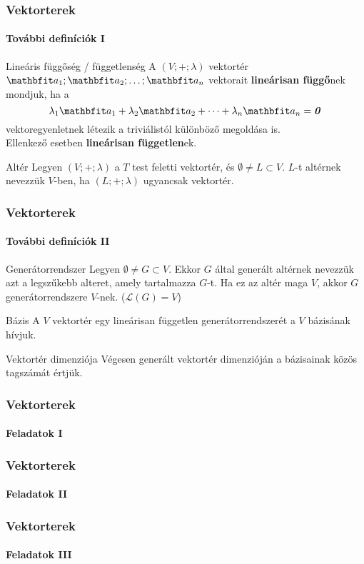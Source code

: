 \begin{frame}
  \frametitle{Vektorterek}
  \framesubtitle{További definíciók I}

  \begin{block}{Lineáris függőség / függetlenség}
    A $(V; +; \lambda)$ vektortér $\rvec a_1; \rvec a_2; \dots; \rvec a_n$
    vektorait \textbf{lineárisan függő}nek mondjuk, ha a
    \[
      \lambda_1 \rvec a_1 +
      \lambda_2 \rvec a_2 +
      \dots +
      \lambda_n \rvec a_n =
      \nvec
    \]
    vektoregyenletnek létezik a triviálistól különböző megoldása is.
    \\[2mm]
    Ellenkező esetben \textbf{lineárisan független}ek.
  \end{block}

  \begin{block}{Altér}
    Legyen $(V; +; \lambda)$ a $T$ test feletti vektortér, és
    $\emptyset \neq L \subset V$. $L$-t altérnek nevezzük $V$-ben, ha
    $(L; +; \lambda)$ ugyancsak vektortér.
  \end{block}
\end{frame}

\begin{frame}
  \frametitle{Vektorterek}
  \framesubtitle{További definíciók II}

  \begin{block}{Generátorrendszer}
    Legyen $\emptyset \neq G \subset V$. Ekkor $G$ által generált altérnek
    nevezzük azt a legszűkebb alteret, amely tartalmazza $G$-t. Ha ez az
    altér maga $V$, akkor $G$ generátorrendszere $V$-nek. ($\mathcal L(G)=V$)
  \end{block}

  \begin{block}{Bázis}
    A $V$ vektortér egy lineárisan független generátorrendszerét a $V$ bázisának
    hívjuk.
  \end{block}

  \begin{block}{Vektortér dimenziója}
    Végesen generált vektortér dimenzióján a bázisainak közös tagszámát értjük.
  \end{block}
\end{frame}

\begin{frame}
  \frametitle{Vektorterek}
  \framesubtitle{Feladatok I}

  
\end{frame}

\begin{frame}
  \frametitle{Vektorterek}
  \framesubtitle{Feladatok II}

  
\end{frame}

\begin{frame}
  \frametitle{Vektorterek}
  \framesubtitle{Feladatok III}

  
\end{frame}
